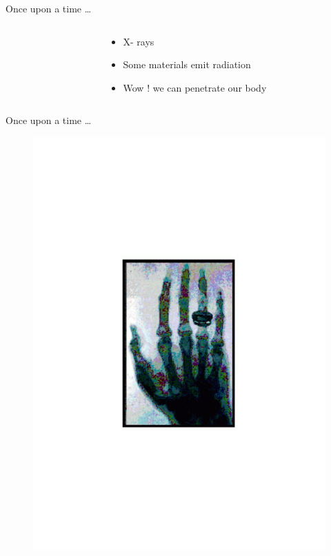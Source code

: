 \begin{frame}{Once upon a time \ldots}
\begin{columns}[T]
\begin{column}{.5\textwidth}
 
    \end{column}
    
    \begin{column}{.5\textwidth}
    
\begin{minipage}[c][.6\textheight][c]{\linewidth}
            \begin{itemize}
                \item X- rays
\item Some materials emit radiation 
\item Wow ! we can penetrate our body
            \end{itemize}
          \end{minipage}    
    
    
    \end{column}
    
    
\end{columns}




\end{frame}

\begin{frame}{Once upon a time \ldots}

\begin{figure}
\vskip-4cm
\centering
\includegraphics[scale=0.5]{figures/20160216_rsw_roentgenhand.pdf}
\end{figure}
\end{frame}

